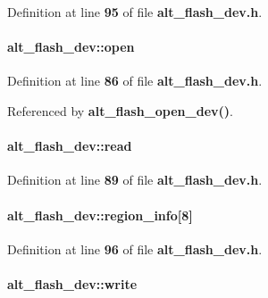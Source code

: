 Definition at line {\bf 95} of file {\bf alt\+\_\+flash\+\_\+dev.\+h}.

\paragraph[{open}]{ alt\+\_\+flash\+\_\+dev\+::open}\label{structalt__flash__dev_a2f557ec67810c1472c7b1d078772875f}


Definition at line {\bf 86} of file {\bf alt\+\_\+flash\+\_\+dev.\+h}.



Referenced by {\bf alt\+\_\+flash\+\_\+open\+\_\+dev()}.

\paragraph[{read}]{ alt\+\_\+flash\+\_\+dev\+::read}\label{structalt__flash__dev_aef733fcd7441de1ef2683816ea91f1bb}


Definition at line {\bf 89} of file {\bf alt\+\_\+flash\+\_\+dev.\+h}.

\paragraph[{region\+\_\+info}]{ alt\+\_\+flash\+\_\+dev\+::region\+\_\+info[8]}\label{structalt__flash__dev_aeaa7aff99e1a905c3bba87c83831e7c4}


Definition at line {\bf 96} of file {\bf alt\+\_\+flash\+\_\+dev.\+h}.

\paragraph[{write}]{ alt\+\_\+flash\+\_\+dev\+::write}\label{structalt__flash__dev_aeebfa398d4446a799c412f9a8c1a5e1e}


